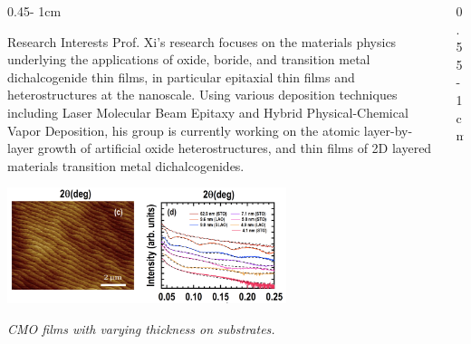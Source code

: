 \documentclass{../psuposter}
\begin{document}
\begin{frame}
\begin{columns}[t, totalwidth=\textwidth]
\begin{column}{0.45\textwidth - 1cm}
    \begin{block}{Research Interests}
        Prof. Xi’s research focuses on the materials physics underlying the applications of oxide, boride, and transition metal dichalcogenide thin films, in particular epitaxial thin films and heterostructures at the nanoscale. 
        Using various deposition techniques including Laser Molecular Beam Epitaxy and Hybrid Physical-Chemical Vapor Deposition, his group is currently working on the atomic layer-by-layer growth of artificial oxide heterostructures, 
        and thin films of 2D layered materials transition metal dichalcogenides. 
        \begin{center}
	    	\includegraphics[width=0.65\textwidth]{images/research}    
	    	
	    	\textit{CMO films with varying thickness on  substrates.} 
    	\end{center}
    	
    \end{block}
\end{column}
\begin{column}{0.55\textwidth - 1cm}



\end{column}
\end{columns}
\end{frame}
\end{document}
